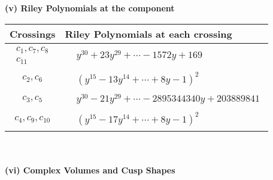 \documentclass[1p]{elsarticle_modified}
\theoremstyle{definition}
\begin{document}
\newpage\renewcommand{\arraystretch}{1}
\flushleft \textbf{(v) Riley Polynomials at the component}\newline \\
\begin{tabular}{m{50pt}|m{274pt}}
Crossings & \hspace{64pt}Riley Polynomials at each crossing \\
\hline $$\begin{aligned}c_{1},c_{7},c_{8}\\c_{11}\end{aligned}$$&$\begin{aligned}
&y^{30}+23 y^{29}+\cdots-1572 y+169
\end{aligned}$\\
\hline $$\begin{aligned}c_{2},c_{6}\end{aligned}$$&$\begin{aligned}
&(y^{15}-13 y^{14}+\cdots+8 y-1)^{2}
\end{aligned}$\\
\hline $$\begin{aligned}c_{3},c_{5}\end{aligned}$$&$\begin{aligned}
&y^{30}-21 y^{29}+\cdots-2895344340 y+203889841
\end{aligned}$\\
\hline $$\begin{aligned}c_{4},c_{9},c_{10}\end{aligned}$$&$\begin{aligned}
&(y^{15}-17 y^{14}+\cdots+8 y-1)^{2}
\end{aligned}$\\
\hline
\end{tabular}\\~\\
\newpage\flushleft \textbf{(vi) Complex Volumes and Cusp Shapes}
\end{document}
